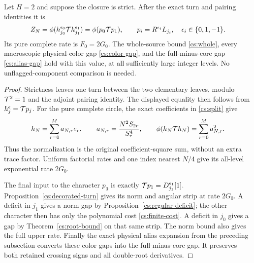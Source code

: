 \begin{corollary}\label{cs:two-leaf-source}
Let \(H=2\) and suppose the closure is strict. After the exact turn
and pairing identities it is
\[
 Z_N=\phi(h_{j_0}^{\epsilon_0}\mathcal T h_{j_1}^{\epsilon_1})
     =\phi(p_0\mathcal T p_1),\qquad
 p_i=R^{\epsilon_i}L_{j_i},\quad \epsilon_i\in\{0,1,-1\}.
\]
Its pure complete rate is \(F_0=2G_0\). The whole-source bound
\eqref{cs:whole}, every macroscopic physical-color gap
\eqref{cs:color-gap}, and the full-minus-core gap
\eqref{cs:alias-gap} hold with this value, at all sufficiently large
integer levels. No unflagged-component comparison is needed.
\end{corollary}
\begin{proof}
Strictness leaves one turn between the two elementary leaves, modulo
\(\mathcal T^2=1\) and the adjoint pairing identity. The displayed equality
then follows from \(h_j^\epsilon=\mathcal T p_j\).
For the pure complete circle, the exact coefficients in
\eqref{cs:split} give
\[
 h_N=\sum_{r=0}^M a_{N,r}e_r,\qquad
 a_{N,r}=\frac{N^2S_{2r}}{S_r^4},\qquad
 \phi(h_N\mathcal T h_N)=\sum_{r=0}^M a_{N,r}^2.
\]
Thus the normalization is the original coefficient-square sum, without
an extra trace factor. Uniform factorial rates and one index nearest
\(N/4\) give its all-level exponential rate \(2G_0\).

The final input to the character \(p_0\) is exactly
\(\mathcal T p_1=D_{j_1}^{\epsilon_1}[1]\). Proposition~\ref{cs:decorated-turn}
gives its norm and angular strip at rate \(2G_0\). A deficit in
\(j_1\) gives a norm gap by Proposition~\ref{cs:regular-deficit};
the other character then has only the polynomial cost
\eqref{cs:finite-cost}. A deficit in \(j_0\) gives a gap by
Theorem~\ref{cs:root-bound} on that same strip. The norm bound also
gives the full upper rate. Finally the exact physical alias expansion
from the preceding subsection converts these color gaps into the
full-minus-core gap. It preserves both retained crossing signs and
all double-root derivatives.
\end{proof}
